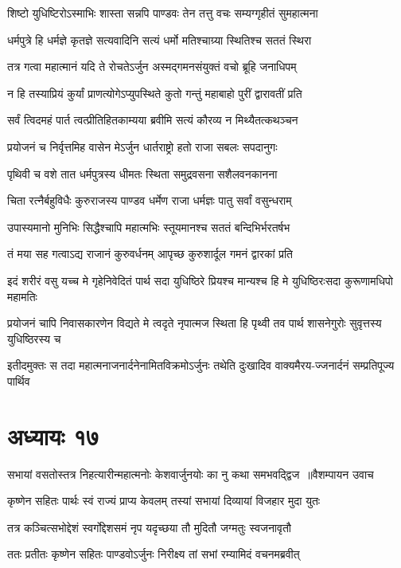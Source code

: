 \twolineshloka
{शिष्टो युधिष्टिरोऽस्माभिः शास्ता सन्नपि पाण्डवः}
{तेन तत्तु वचः सम्यग्गृहीतं सुमहात्मना}


\twolineshloka
{धर्मपुत्रे हि धर्मज्ञे कृतज्ञे सत्यवादिनि}
{सत्यं धर्मो मतिश्चाग्र्या स्थितिश्च सततं स्थिरा}


\twolineshloka
{तत्र गत्वा महात्मानं यदि ते रोचतेऽर्जुन}
{अस्मद्गमनसंयुक्तं वचो ब्रूहि जनाधिपम्}


\twolineshloka
{न हि तस्याप्रियं कुर्यां प्राणत्योगेऽप्युपस्थिते}
{कुतो गन्तुं महाबाहो पुरीं द्वारावतीं प्रति}


\twolineshloka
{सर्वं त्विदमहं पार्त त्वत्प्रीतिहितकाम्यया}
{ब्रवीमि सत्यं कौरव्य न मिथ्यैतत्कथञ्चन}


\twolineshloka
{प्रयोजनं च निर्वृत्तमिह वासेन मेऽर्जुन}
{धार्तराष्ट्रो हतो राजा सबलः सपदानुगः}


\twolineshloka
{पृथिवी च वशे तात धर्मपुत्रस्य धीमतः}
{स्थिता समुद्रवसना सशैलवनकानना}


\twolineshloka
{चिता रत्नैर्बहुविधैः कुरुराजस्य पाण्डव}
{धर्मेण राजा धर्मज्ञः पातु सर्वां वसुन्धराम्}


\twolineshloka
{उपास्यमानो मुनिभिः सिद्धैश्चापि महात्मभिः}
{स्तूयमानश्च सततं बन्दिभिर्भरतर्षभ}


\twolineshloka
{तं मया सह गत्वाऽद्य राजानं कुरुवर्धनम्}
{आपृच्छ कुरुशार्दूल गमनं द्वारकां प्रति}


\twolineshloka
{इदं शरीरं वसु यच्च मे गृहेनिवेदितं पार्थ सदा युधिष्ठिरे}
{प्रियश्च मान्यश्च हि मे युधिष्ठिरःसदा कुरूणामधिपो महामतिः}


\twolineshloka
{प्रयोजनं चापि निवासकारणेन विद्यते मे त्वदृते नृपात्मज}
{स्थिता हि पृथ्वी तव पार्थ शासनेगुरोः सुवृत्तस्य युधिष्ठिरस्य च}


\twolineshloka
{इतीदमुक्तः स तदा महात्मनाजनार्दनेनामितविक्रमोऽर्जुनः}
{तथेति दुःखादिव वाक्यमैरय-ज्जनार्दनं सम्प्रतिपूज्य पार्थिव}


\chapter{अध्यायः १७}
\threelineshloka
{सभायां वसतोस्तत्र निहत्यारीन्महात्मनोः}
{केशवार्जुनयोः का नु कथा समभवद्द्विज ॥वैशम्पायन उवाच}
{}


\twolineshloka
{कृष्णेन सहितः पार्थः स्वं राज्यं प्राप्य केवलम्}
{तस्यां सभायां दिव्यायां विजहार मुदा युतः}


\twolineshloka
{तत्र कञ्चित्सभोद्देशं स्वर्गोद्देशसमं नृप}
{यदृच्छया तौ मुदितौ जग्मतुः स्वजनावृतौ}


\twolineshloka
{ततः प्रतीतः कृष्णेन सहितः पाण्डवोऽर्जुनः}
{निरीक्ष्य तां सभां रम्यामिदं वचनमब्रवीत्}


